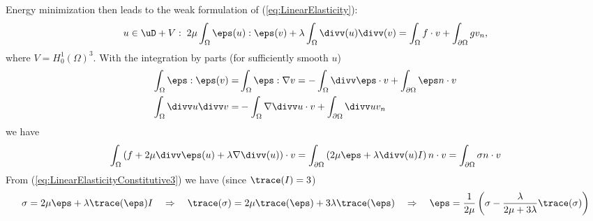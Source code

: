 %
Energy minimization then leads to the weak formulation of (\ref{eq:LinearElasticity}):
%
\begin{equation}\label{eq:}
u\in \uD + V:\; 2\mu\int_{\Omega}\eps(u):\eps(v)+\lambda\int_{\Omega}\divv(u)\divv(v) 
= \int_{\Omega} f\cdot v + \int_{\partial\Omega} gv_n,
\end{equation}
%
where $V=H^1_0(\Omega)^3$. With the integration by parts (for sufficiently smooth $u$)
%
\begin{equation}\label{eq:IPPElasticity}
\begin{split}
\int_{\Omega}\eps:\eps(v) =& \int_{\Omega}\eps:\nabla v = - \int_{\Omega}\divv\eps\cdot v
+ \int_{\partial\Omega}\eps n\cdot v\\
\int_{\Omega}\divv u \divv v =& - \int_{\Omega}\nabla\divv u \cdot v + \int_{\partial\Omega}\divv u v_n
\end{split}\end{equation}
% 
we have
%
\begin{align*}
\int_{\Omega} \left( f + 2\mu\divv\eps(u)+\lambda\nabla\divv(u)\right) \cdot v
= \int_{\partial\Omega} \left( 2\mu \eps +\lambda\divv(u) I \right)n\cdot v
= \int_{\partial\Omega}\sigma n \cdot v
\end{align*}
%
From (\ref{eq:LinearElasticityConstitutive3}) we have (since $\trace(I)=3$)
%
\begin{align*}
\sigma = 2\mu\eps + \lambda\trace(\eps) I\quad\Rightarrow\quad \trace(\sigma) = 
2\mu\trace(\eps) + 3\lambda\trace(\eps)\quad\Rightarrow\quad 
\eps = \frac{1}{2\mu}\left( \sigma - \frac{\lambda}{2\mu+3\lambda}\trace(\sigma)\right)
\end{align*}
%


%
%
\printbibliography[title=References Section~\thesection]
